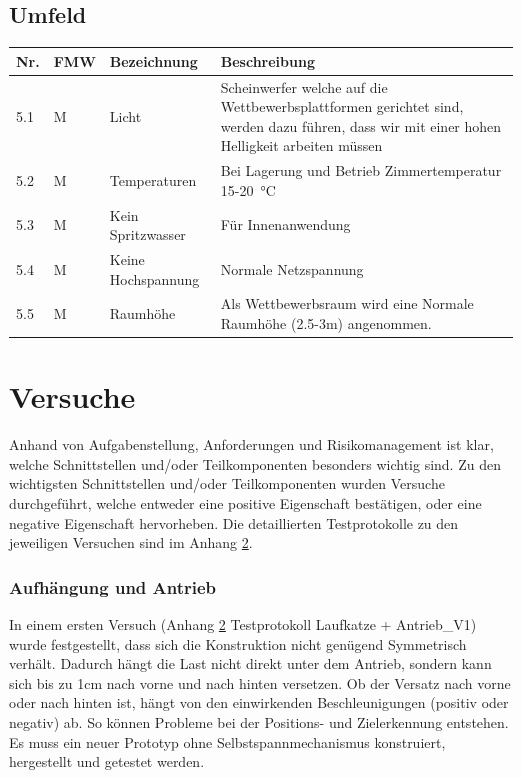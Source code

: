 \documentclass[a4paper]{report}
\begin{document}
\section{Umfeld}
\label{app:sec:Umfeld}
\begin{tabular}{|p{}|p{}|p{}|p{}|}
	\hline
	\textbf{Nr.} & \textbf{FMW\footnotemark} & \textbf{Bezeichnung} & \textbf{Beschreibung} \\
	\hline
	5.1 & M & Licht & Scheinwerfer welche auf die Wettbewerbsplattformen gerichtet sind, werden dazu führen, dass wir mit einer hohen Helligkeit arbeiten müssen \\
	\hline
	5.2 & M & Temperaturen & Bei Lagerung und Betrieb Zimmertemperatur 15-\SI{20}{\degreeCelsius}\\
	\hline
	5.3 & M & Kein Spritzwasser & Für Innenanwendung\\
	\hline
	5.4 & M & Keine Hochspannung & Normale Netzspannung\\
	\hline
	5.5 & M & Raumhöhe & Als Wettbewerbsraum wird eine Normale Raumhöhe (2.5-3m) angenommen.\\
	\hline
\end{tabular}

\chapter{Versuche}
\label{app:ch:Versuche}

Anhand von Aufgabenstellung, Anforderungen und Risikomanagement ist klar, welche Schnittstellen und/oder Teilkomponenten besonders wichtig sind. Zu den wichtigsten Schnittstellen und/oder Teilkomponenten wurden Versuche durchgeführt, welche entweder eine positive Eigenschaft bestätigen, oder eine negative Eigenschaft hervorheben. Die detaillierten Testprotokolle zu den jeweiligen Versuchen sind im Anhang \ref{app:ch:Versuche}.

\subsection{Aufhängung und Antrieb}
In einem ersten Versuch (Anhang \ref{app:ch:Versuche} Testprotokoll Laufkatze + Antrieb\_V1) wurde festgestellt, dass sich die Konstruktion nicht genügend Symmetrisch verhält. Dadurch hängt die Last nicht direkt unter dem Antrieb, sondern kann sich bis zu 1cm nach vorne und nach hinten versetzen. Ob der Versatz nach vorne oder nach hinten ist, hängt von den einwirkenden Beschleunigungen (positiv oder negativ) ab. So können Probleme bei der Positions- und Zielerkennung entstehen. Es muss ein neuer Prototyp ohne Selbstspannmechanismus konstruiert, hergestellt und getestet werden.
\end{document}
